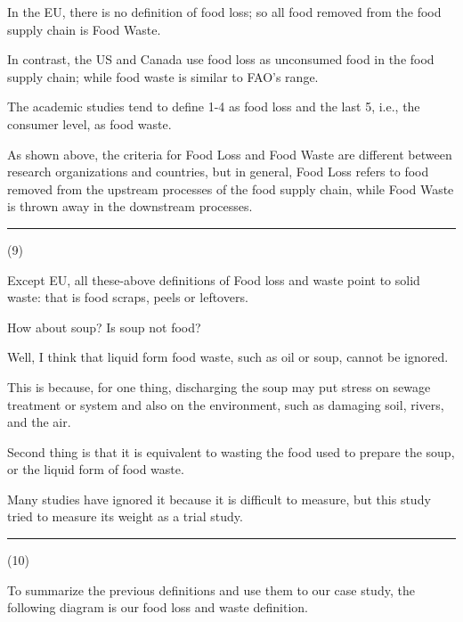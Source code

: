 \documentclass{article}
\begin{document}
\begin{multicols}{2}
\begin{spacing}{1.1}
\vspace{1em}

In the EU, 
there is no definition of food loss; so
all food removed from the food supply chain is Food Waste.

\vspace{1em}

In contrast, 
the US and Canada use food loss as unconsumed food in the food supply chain;
while food waste is similar to FAO's range.

\vspace{1em}

The academic studies tend to define 1-4 as food loss and the last 5, 
i.e., the consumer level, as food waste.

\vspace{1em}

As shown above, 
the criteria for Food Loss and Food Waste are different 
between research organizations and countries, 
but in general, 
Food Loss refers to food removed from the upstream processes of the food supply chain,
while Food Waste is thrown away in the downstream processes.

\noindent\rule{0.1\textwidth}{1pt}\small(9)

Except EU, 
all these-above definitions of Food loss and waste point to solid waste:
that is food scraps, peels or leftovers.

How about soup?
Is soup not food?

Well, I think that liquid form food waste, such as oil or soup, cannot be ignored.

\vspace{1em}

This is because, for one thing, 
discharging the soup may put stress on sewage treatment or system and 
also on the environment, such as damaging soil, rivers, and the air.

Second thing is that it is equivalent to wasting the food used to prepare the soup, or the liquid form of food waste.

Many studies have ignored it because it is difficult to measure, 
but this study tried to measure its weight as a trial study.

\noindent\rule{0.2\textwidth}{1pt}(10)

To summarize the previous definitions and use them to our case study, 
the following diagram is our food loss and waste definition.


\end{spacing}
\end{multicols}
\end{document}
